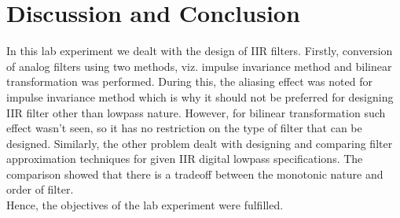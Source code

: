 \documentclass{lab_sheet}
\begin{document}
\section{Discussion and Conclusion}
In this lab experiment we dealt with the design of IIR filters. Firstly, conversion of analog filters using two methods, viz. impulse invariance method and bilinear transformation was performed. During this, the aliasing effect was noted for impulse invariance method which is why it should not be preferred for designing IIR filter other than lowpass nature. However, for bilinear transformation such effect wasn't seen, so it has no restriction on the type of filter that can be designed. Similarly, the other problem dealt with designing and comparing filter approximation techniques for given IIR digital lowpass specifications. The comparison showed that there is a tradeoff between the monotonic nature and order of filter. \\
Hence, the objectives of the lab experiment were fulfilled.
\end{document}
